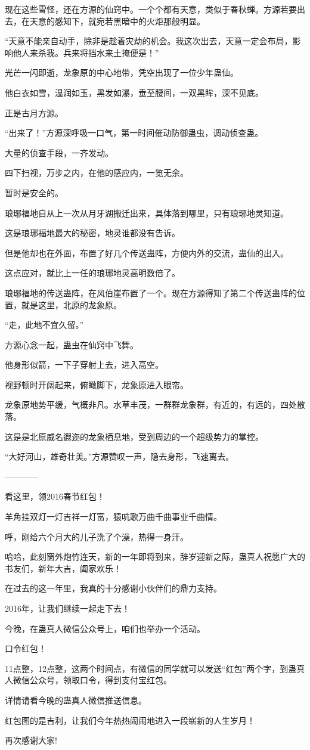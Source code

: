 \begin{this_body}
现在这些雪怪，还在方源的仙窍中。一个个都有天意，类似于春秋蝉。方源若要出去，在天意的感知下，就宛若黑暗中的火炬那般明显。

“天意不能亲自动手，除非是趁着灾劫的机会。我这次出去，天意一定会布局，影响他人来杀我。兵来将挡水来土掩便是！”

光芒一闪即逝，龙象原的中心地带，凭空出现了一位少年蛊仙。

他白衣如雪，温润如玉，黑发如瀑，垂至腰间，一双黑眸，深不见底。

正是古月方源。

“出来了！”方源深呼吸一口气，第一时间催动防御蛊虫，调动侦查蛊。

大量的侦查手段，一齐发动。

四下扫视，万步之内，在他的感应内，一览无余。

暂时是安全的。

琅琊福地自从上一次从月牙湖搬迁出来，具体落到哪里，只有琅琊地灵知道。

这是琅琊福地最大的秘密，地灵谁都没有告诉。

但是他却也在外面，布置了好几个传送蛊阵，方便内外的交流，蛊仙的出入。

这点应对，就比上一任的琅琊地灵高明数倍了。

琅琊福地的传送蛊阵，在风伯崖布置了一个。现在方源得知了第二个传送蛊阵的位置，就是这里，北原的龙象原。

“走，此地不宜久留。”

方源心念一起，蛊虫在仙窍中飞舞。

他身形似箭，一下子穿射上去，进入高空。

视野顿时开阔起来，俯瞰脚下，龙象原进入眼帘。

龙象原地势平缓，气概非凡。水草丰茂，一群群龙象群，有近的，有远的，四处散落。

这是是北原威名遐迩的龙象栖息地，受到周边的一个超级势力的掌控。

“大好河山，雄奇壮美。”方源赞叹一声，隐去身形，飞速离去。

------------

看这里，领2016春节红包！

羊角挂双灯一灯吉祥一灯富，猿吭歌万曲千曲事业千曲情。

呼，刚给六个月大的儿子洗了个澡，热得一身汗。

哈哈，此刻窗外炮竹连天，新的一年即将到来，辞岁迎新之际，蛊真人祝愿广大的书友们，新年大吉，阖家欢乐！

在过去的这一年里，我真的十分感谢小伙伴们的鼎力支持。

2016年，让我们继续一起走下去！

今晚，在蛊真人微信公众号上，咱们也举办一个活动。

口令红包！

11点整，12点整，这两个时间点，有微信的同学就可以发送“红包”两个字，到蛊真人微信公众号，领取口令，得到支付宝红包。

详情请看今晚的蛊真人微信推送信息。

红包图的是吉利，让我们今年热热闹闹地进入一段崭新的人生岁月！

再次感谢大家!

\end{this_body}

